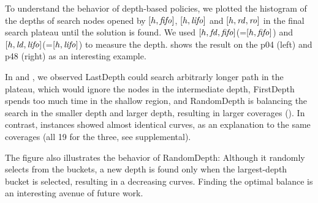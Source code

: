 To understand the behavior of depth-based policies, we plotted the histogram of
the depths of search nodes opened by
$[h,\mbox{\textit{fifo}}]$, $[h,\mbox{\textit{lifo}}]$ and $[h,\mbox{\textit{rd}},\mbox{\textit{ro}}]$
in the final search plateau until the solution is found.
We used $[h,\mbox{\textit{fd}},\mbox{\textit{fifo}}]$(=$[h,\mbox{\textit{fifo}}]$) and $[h,\mbox{\textit{ld}},\mbox{\textit{lifo}}]$(=$[h,\mbox{\textit{lifo}}]$) to
measure the depth.
 shows the result
on the  p04 (left) and  p48 (right) as an
interesting example.

In  and , we observed
LastDepth could search arbitrarly longer path in the
plateau, which would ignore the nodes in the intermediate depth,
FirstDepth spends too much time in the shallow region,
and RandomDepth is balancing the search in the smaller depth and larger
depth, resulting in larger coverages ().
% 
In contrast,  instances showed
almost identical curves, as an explanation to the
same coverages (all 19 for the three, see supplemental).

The figure also illustrates the behavior of RandomDepth: Although it
randomly selects from the buckets,
a new depth is found only when the largest-depth bucket is selected,
resulting in a decreasing curves.
Finding the optimal balance is an interesting avenue of
future work.

